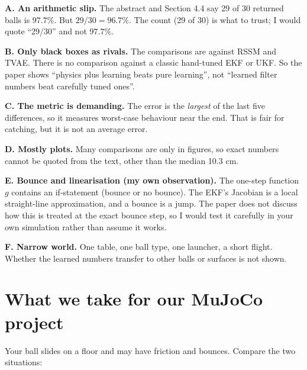 \documentclass[11pt,a4paper]{article}
\begin{document}
\begin{warn}
\textbf{A. An arithmetic slip.} The abstract and Section 4.4 say 29 of 30 returned balls is
$97.7\%$. But $29/30=96.7\%$. The count (29 of 30) is what to trust; I would quote ``29/30'' and not $97.7\%$.

\textbf{B. Only black boxes as rivals.} The comparisons are against RSSM and TVAE. There is no
comparison against a classic hand-tuned EKF or UKF. So the paper shows ``physics plus learning beats pure
learning'', not ``learned filter numbers beat carefully tuned ones''.

\textbf{C. The metric is demanding.} The error is the \emph{largest} of the last five
differences, so it measures worst-case behaviour near the end. That is fair for catching, but it is
not an average error.

\textbf{D. Mostly plots.} Many comparisons are only in figures, so exact numbers cannot be quoted
from the text, other than the median 10.3 cm.

\textbf{E. Bounce and linearisation (my own observation).} The one-step function $g$ contains an
if-statement (bounce or no bounce). The EKF's Jacobian is a local straight-line approximation, and
a bounce is a jump. The paper does not discuss how this is treated at the exact bounce step, so I would test it carefully in your own simulation rather
than assume it works.

\textbf{F. Narrow world.} One table, one ball type, one launcher, a short flight. Whether the
learned numbers transfer to other balls or surfaces is not shown.
\end{warn}

\section{What we take for our MuJoCo project}

Your ball slides on a floor and may have friction and bounces. Compare the two situations:
\end{document}
